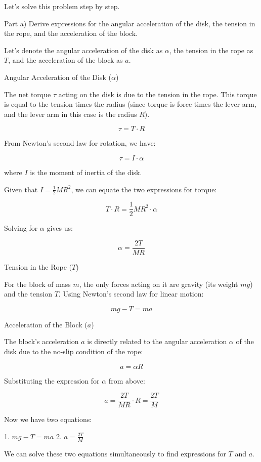 \documentclass[a4paper,11pt]{article}
\begin{document}
Let's solve this problem step by step.

Part a) Derive expressions for the angular acceleration of the disk, the tension in the rope, and the acceleration of the block.

Let's denote the angular acceleration of the disk as \( \alpha \), the tension in the rope as \( T \), and the acceleration of the block as \( a \).

Angular Acceleration of the Disk (\( \alpha \))

The net torque \( \tau \) acting on the disk is due to the tension in the rope. This torque is equal to the tension times the radius (since torque is force times the lever arm, and the lever arm in this case is the radius \( R \)).

\[
\tau = T \cdot R
\]

From Newton's second law for rotation, we have:

\[
\tau = I \cdot \alpha
\]

where \( I \) is the moment of inertia of the disk.

Given that \( I = \frac{1}{2} M R^{2} \), we can equate the two expressions for torque:

\[
T \cdot R = \frac{1}{2} M R^{2} \cdot \alpha
\]

Solving for \( \alpha \) gives us:

\[
\alpha = \frac{2T}{M R}
\]

Tension in the Rope (\( T \))

For the block of mass \( m \), the only forces acting on it are gravity (its weight \( mg \)) and the tension \( T \). Using Newton's second law for linear motion:

\[
m g - T = m a
\]

Acceleration of the Block (\( a \))

The block's acceleration \( a \) is directly related to the angular acceleration \( \alpha \) of the disk due to the no-slip condition of the rope:

\[
a = \alpha R
\]

Substituting the expression for \( \alpha \) from above:

\[
a = \frac{2T}{M R} \cdot R = \frac{2T}{M}
\]

Now we have two equations:

1. \( m g - T = m a \)
2. \( a = \frac{2T}{M} \)

We can solve these two equations simultaneously to find expressions for \( T \) and \( a \).
\end{document}
